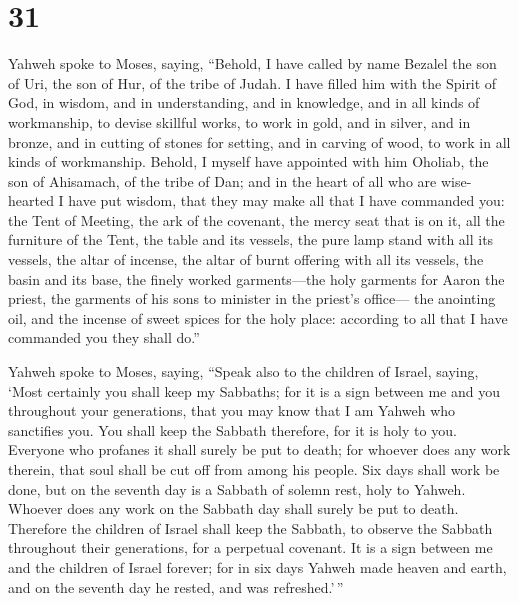 \hypertarget{section-30}{%
\section{31}\label{section-30}}

 Yahweh spoke to Moses, saying,  ``Behold, I
have called by name Bezalel the son of Uri, the son of Hur, of the tribe
of Judah.  I have filled him with the Spirit of God, in
wisdom, and in understanding, and in knowledge, and in all kinds of
workmanship,  to devise skillful works, to work in gold, and
in silver, and in bronze,  and in cutting of stones for
setting, and in carving of wood, to work in all kinds of workmanship.
 Behold, I myself have appointed with him Oholiab, the son
of Ahisamach, of the tribe of Dan; and in the heart of all who are
wise-hearted I have put wisdom, that they may make all that I have
commanded you:  the Tent of Meeting, the ark of the
covenant, the mercy seat that is on it, all the furniture of the Tent,
 the table and its vessels, the pure lamp stand with all its
vessels, the altar of incense,  the altar of burnt offering
with all its vessels, the basin and its base,  the finely
worked garments---the holy garments for Aaron the priest, the garments
of his sons to minister in the priest's office---  the
anointing oil, and the incense of sweet spices for the holy place:
according to all that I have commanded you they shall do.''

 Yahweh spoke to Moses, saying,  ``Speak also
to the children of Israel, saying, `Most certainly you shall keep my
Sabbaths; for it is a sign between me and you throughout your
generations, that you may know that I am Yahweh who sanctifies you.
 You shall keep the Sabbath therefore, for it is holy to
you. Everyone who profanes it shall surely be put to death; for whoever
does any work therein, that soul shall be cut off from among his people.
 Six days shall work be done, but on the seventh day is a
Sabbath of solemn rest, holy to Yahweh. Whoever does any work on the
Sabbath day shall surely be put to death.  Therefore the
children of Israel shall keep the Sabbath, to observe the Sabbath
throughout their generations, for a perpetual covenant.  It
is a sign between me and the children of Israel forever; for in six days
Yahweh made heaven and earth, and on the seventh day he rested, and was
refreshed.'\,''

